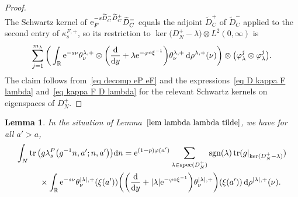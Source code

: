 \documentclass[10pt,a4paper]{amsart}
\numberwithin{equation}{section}
\newtheorem{Lemma}[Theorem]{Lemma}
\DeclareMathOperator{\tr}{tr}
\DeclareMathOperator{\spec}{spec}
\DeclareMathOperator{\sgn}{sgn}
\newcommand{\R}{\mathbb{R}}
\begin{document}
\begin{proof}
\begin{equation}
\end{equation}
The Schwartz kernel of $ {\rm e}_F^{-s \widetilde{D}_C^- \widetilde{D}_C^{+} }\widetilde{D}_C^{-}$ equals the adjoint $\widetilde{D}_C^+$ of $\widetilde{D}_C^-$ applied to the second entry of $\kappa_s^{F, +}$, so its restriction to $\ker\big(D_N^+ - \lambda\big) \otimes L^2(0, \infty)$ is
\begin{equation} \label{eq kappa F D lambda}
\sum_{j=1}^{m_{\lambda}}\bigg(\int_{\R}
{\rm e}^{-s\nu} \theta^{\lambda, +}_{\nu}\otimes \bigg( \frac{\rm d}{{\rm d}y}+\lambda {\rm e}^{-\varphi \circ \xi^{-1}}\bigg) \theta^{\lambda, +}_{\nu} \, {\rm d}\rho^{\lambda, +}(\nu)\bigg) \otimes \big(\varphi_{\lambda}^j \otimes \varphi_{\lambda}^j \big).
\end{equation}
The claim follows from~\eqref{eq decomp eP eF} and the expressions~\eqref{eq D kappa F lambda} and~\eqref{eq kappa F D lambda} for the relevant Schwartz kernels on eigenspaces of $D_N^+$.
\end{proof}

\begin{Lemma}\label{lem kernel on diagonal}
In the situation of Lemma~$\ref{lem lambda lambda tilde}$, we have for all $a'>a$,
\begin{gather}
\int_N \tr\big( g \lambda_s^{P}\big(g^{-1}n, a'; n, a'\big) \big) {\rm d}n
 = {\rm e}^{(1-p)\varphi(a')}\sum_{\lambda \in \spec(D_N^+)}\sgn(\lambda)\tr(g|_{\ker(D_N^+ - \lambda)}) \nonumber
 \\ \qquad
 {}\times
\int_{\R}
{\rm e}^{-s\nu} \theta^{|\lambda|, +}_{\nu} (\xi(a')) \bigg( \bigg( \frac{\rm d}{{\rm d}y}+|\lambda| {\rm e}^{-\varphi \circ \xi^{-1}}\bigg) \theta^{|\lambda|, +}_{\nu} \bigg)(\xi(a'))\,{\rm d}\rho^{|\lambda|, +}(\nu) .
\label{eq kernel on diagonal}
\end{gather}
\end{Lemma}
\end{document}
